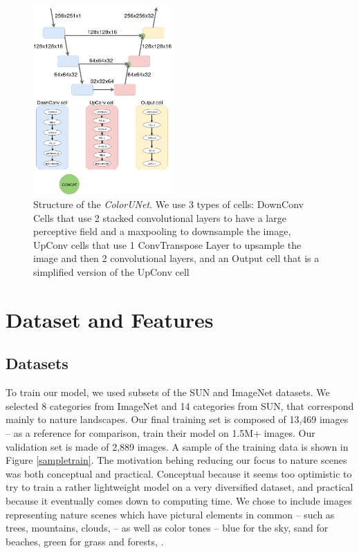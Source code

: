 \documentclass[10pt,twocolumn,letterpaper]{article}
\begin{document}
\begin{figure}
\begin{center}
\includegraphics[width=200px]{diagram}
\caption{Structure of the \textit{ColorUNet}. We use 3 types of cells: DownConv Cells that use 2 stacked convolutional layers to have a large perceptive field and a maxpooling to downsample the image, UpConv cells that use 1 ConvTranspose Layer to upsample the image and then 2 convolutional layers, and an Output cell that is a simplified version of the UpConv cell}
\label{structure}
\end{center}
\end{figure}

\section{Dataset and Features}

\subsection{Datasets}
To train our model, we used subsets of the SUN \cite{xiao2010sun} and ImageNet \cite{russakovsky2015imagenet} datasets. We selected 8 categories from ImageNet and 14 categories from SUN, that correspond mainly to nature landscapes. Our final training set is composed of 13,469 images -- as a reference for comparison, \cite{zhang2016colorful} train their model on 1.5M+ images. Our validation set is made of 2,889 images. A sample of the training data is shown in Figure \ref{sampletrain}.
The motivation behing reducing our focus to nature scenes was both conceptual and practical. Conceptual because it seems too optimistic to try to train a rather lightweight model on a very diversified dataset, and practical because it eventually comes down to computing time. We chose to include images representing nature scenes which have pictural elements in common -- such as trees, mountains, clouds, \etc -- as well as color tones -- blue for the sky, sand for beaches, green for grass and forests,  \etc.
\end{document}
